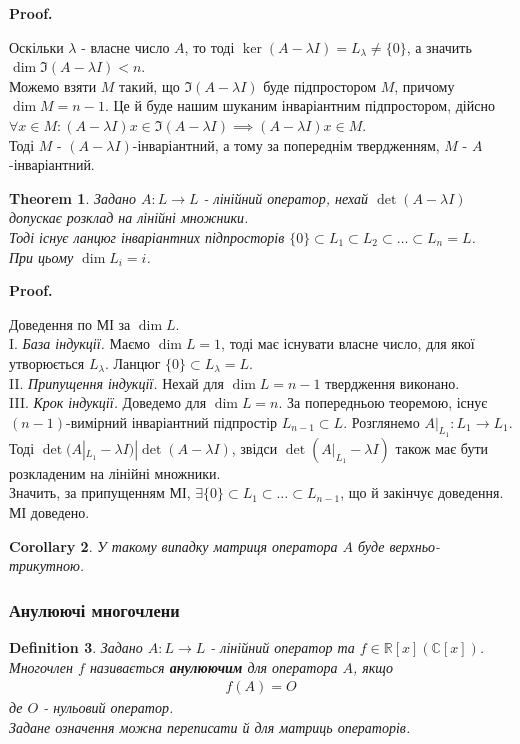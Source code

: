 \documentclass[a4paper, 10pt]{article}
\makeatletter
\theoremstyle{theoremdd}
\newtheorem{theorem}{Theorem}[subsection]
\newtheorem{definition}[theorem]{Definition}
\newtheorem{corollary}[theorem]{Corollary}
\renewenvironment{proof}[1][Proof.\\]{\par
\pushQED{\hfill \qed}%
\normalfont \topsep6\p@\@plus6\p@\relax
\trivlist
\item\relax
{\bfseries
#1\@addpunct{.}}\hspace\labelsep\ignorespaces
}{%
\popQED\endtrivlist\@endpefalse
}
\makeatother
\begin{document}
\begin{proof}
Оскільки $\lambda$ - власне число $A$, то тоді $\ker (A-\lambda I) = L_{\lambda} \neq \{0\}$, а значить $\dim \Im (A-\lambda I) < n$.\\
Можемо взяти $M$ такий, що $\Im (A-\lambda I)$ буде підпростором $M$, причому $\dim M = n-1$. Це й буде нашим шуканим інваріантним підпростором, дійсно\\
$\forall x \in M: (A-\lambda I)x \in \Im (A-\lambda I) \implies (A-\lambda I)x \in M$.\\
Тоді $M$ - $(A-\lambda I)$-інваріантний, а тому за попереднім твердженням, $M$ - $A$-інваріантний.
\end{proof}

\begin{theorem}
Задано $A: L \to L$ - лінійний оператор, нехай $\det (A-\lambda I)$ допускає розклад на лінійні множники.\\
Тоді існує ланцюг інваріантних підпросторів $\{0\} \subset L_1 \subset L_2 \subset \dots \subset L_n = L$.\\
При цьому $\dim L_i = i$.
\end{theorem}

\begin{proof}
Доведення по МІ за $\dim L$.\\
I. \textit{База індукції.} Маємо $\dim L = 1$, тоді має існувати власне число, для якої утворюється $L_{\lambda}$. Ланцюг $\{0\} \subset L_{\lambda} = L$.\\
II. \textit{Припущення індукції.} Нехай для $\dim L = n-1$ твердження виконано.\\
III. \textit{Крок індукції.} Доведемо для $\dim L = n$. За попередньою теоремою, існує $(n-1)$-вимірний інваріантний підпростір $L_{n-1} \subset L$. Розглянемо $A|_{L_1}: L_1 \to L_1$. Тоді $\det (A|_{L_1}-\lambda I) | \det(A-\lambda I)$, звідси $\det (A|_{L_1}-\lambda I)$ також має бути розкладеним на лінійні множники.\\
Значить, за припущенням МІ, $\exists \{0\} \subset L_1 \subset \dots \subset L_{n-1}$, що й закінчує доведення.\\
МІ доведено.
\end{proof}

\begin{corollary}
У такому випадку матриця оператора $A$ буде верхньо-трикутною.
\end{corollary}
\fi

\iffalse
\subsubsection*{Анулюючі многочлени}
\begin{definition}
Задано $A: L \to L$ - лінійний оператор та $f \in \mathbb{R}[x] (\mathbb{C}[x])$.\\
Многочлен $f$ називається \textbf{анулюючим} для оператора $A$, якщо
\begin{align*}
f(A) = O
\end{align*}
де $O$ - нульовий оператор.\\
Задане означення можна переписати й для матриць операторів.
\end{definition}
\end{document}
